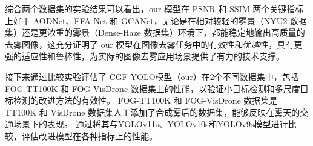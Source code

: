 综合两个数据集的实验结果可以看出，our 模型在 PSNR 和 SSIM 两个关键指标上好于 AODNet、FFA-Net 和 GCANet，无论是在相对较轻的雾景（NYU2 数据集）还是更浓重的雾景（Dense-Haze 数据集）环境下，都能稳定地输出高质量的去雾图像，这充分证明了 our 模型在图像去雾任务中的有效性和优越性，具有更强的适应性和鲁棒性，为实际的图像去雾应用场景提供了有力的技术支撑。





接下来通过比较实验评估了 CGF-YOLO模型（our）在2个不同数据集中，包括 FOG-TT100K 和 FOG-VisDrone 数据集上的性能，以验证小目标检测和多尺度目标检测的改进方法的有效性。
FOG-TT100K 和 FOG-VisDrone 数据集是 TT100K 和 VisDrone 数据集人工添加了合成雾后的数据集，能够反映在雾天的交通场景下的表现。
通过将其与YOLOv11s、YOLOv10s和YOLOv9s模型进行比较，评估改进模型在各种指标上的性能。

